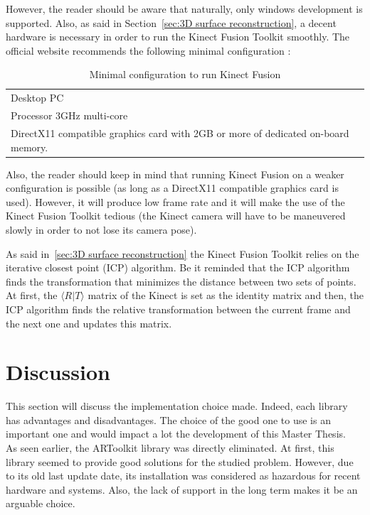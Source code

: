 However, the reader should be aware that naturally, only windows development is supported. Also, as said in Section~\ref{sec:3D surface reconstruction}, a decent hardware is necessary in order to run the Kinect Fusion Toolkit smoothly. The official website recommends the following minimal configuration \cite{kinect}:


\begin{table}[h]
\caption{Minimal configuration to run Kinect Fusion}
\begin{tabular}{l}
 Desktop PC \\
 Processor 3GHz multi-core\\
 DirectX11 compatible graphics card with 2GB or more of dedicated on-board memory.
\end{tabular}
\label{tab:kinectfusion-minimalconfiguration}
\end{table}

Also, the reader should keep in mind that running Kinect Fusion on a weaker configuration is possible (as long as a DirectX11 compatible graphics card is used). However, it will produce low frame rate and it will make the use of the Kinect Fusion Toolkit tedious (the Kinect camera will have to be maneuvered slowly in order to not lose its camera pose).

As said in~\ref{sec:3D surface reconstruction} the Kinect Fusion Toolkit relies on the iterative closest point (ICP) algorithm. Be it reminded that the ICP algorithm finds the transformation that minimizes the distance between two sets of points. At first, the $\langle R\vert T\rangle$ matrix of the Kinect is set as the identity matrix and then, the ICP algorithm finds the relative transformation between the current frame and the next one and updates this matrix.\\

\section{Discussion}
This section will discuss the implementation choice made. Indeed, each library has advantages and disadvantages. The choice of the good one to use is an important one and would impact a lot the development of this Master Thesis.\\ 

As seen earlier, the ARToolkit library was directly eliminated. At first, this library seemed to provide good solutions for the studied problem. However, due to its old last update date, its installation was considered as hazardous for recent hardware and systems. Also, the lack of support in the long term makes it be an arguable choice.\\

